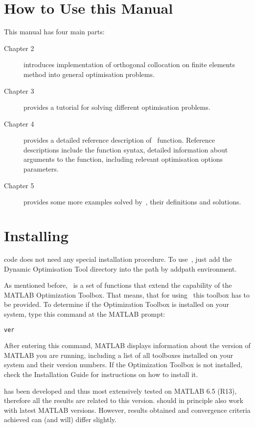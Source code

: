 \section{How to Use this Manual}
\label{sec:howtouseman}

This manual has four main parts:
\begin{description}
\item[Chapter 2] introduces implementation of orthogonal collocation
  on finite elements method into general optimisation problems.
\item[Chapter 3] provides a tutorial for solving different
  optimisation problems.
\item[Chapter 4] provides a detailed reference description
  of~ function. Reference descriptions include the
  function syntax, detailed information about arguments to the
  function, including relevant optimisation options parameters.
\item[Chapter 5] provides some more examples solved by~,
  their definitions and solutions.
\end{description}

\section{Installing~}
\label{sec:instdynopt}

 code does not need any special installation procedure. To
use~, just add the Dynamic Optimisation Tool directory
 into the path by addpath environment. 

As mentioned before,~ is a set of functions that extend
the capability of the MATLAB Optimization Toolbox. That means, that
for using~ this toolbox has to be provided. To determine
if the Optimization Toolbox is installed on your system, type this
command at the MATLAB prompt:
\begin{verbatim}
ver
\end{verbatim}
After entering this command, MATLAB displays information about the
version of MATLAB you are running, including a list of all toolboxes
installed on your system and their version numbers.  If the
Optimization Toolbox is not installed, check the Installation Guide
for instructions on how to install it.

 has been developed and thus most extensively tested on
MATLAB 6.5 (R13), therefore all the results are related to this
version.   should in principle also work with latest
MATLAB versions.  However, results obtained and convergence criteria
achieved can (and will) differ slightly.


